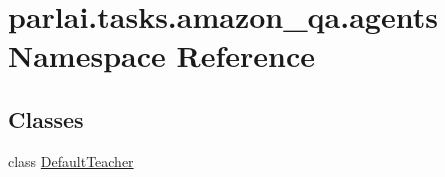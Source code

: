 \hypertarget{namespaceparlai_1_1tasks_1_1amazon__qa_1_1agents}{}\section{parlai.\+tasks.\+amazon\+\_\+qa.\+agents Namespace Reference}
\label{namespaceparlai_1_1tasks_1_1amazon__qa_1_1agents}
\subsection*{Classes}
\begin{DoxyCompactItemize}
\item 
class \hyperlink{classparlai_1_1tasks_1_1amazon__qa_1_1agents_1_1DefaultTeacher}{Default\+Teacher}
\end{DoxyCompactItemize}
